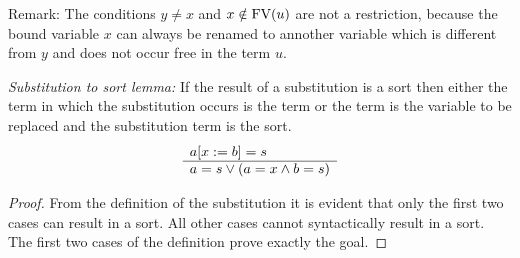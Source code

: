 Remark:
        The conditions $y \ne x$ and $x \notin \text{FV}(u)$ are not a restriction,
        because the bound variable $x$ can always be renamed to annother
        variable which is different from $y$ and does not occur free in the term
        $u$.



\begin{lemma}
    \label{SubstitutionToSort}
    \emph{Substitution to sort lemma:}
    If the result of a substitution is a sort then either the term in
    which the substitution occurs is the term or the term is the variable to be
    replaced and the substitution term is the sort.
    $$
        \begin{array}{l} 
            a[x:=b] = s
         \\ \hline 
            a = s \lor (a = x \land b = s)
        \end{array}
    $$
    \begin{proof}
        From the definition of the substitution it is evident that only the
        first two cases can result in a sort. All other cases cannot
        syntactically result in a sort. The first two cases of the definition
        prove exactly the goal.
    \end{proof}
\end{lemma}


